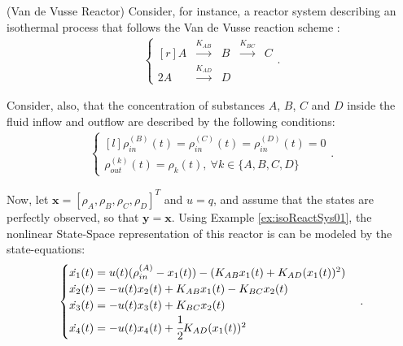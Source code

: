 \documentclass[a4paper,11pt]{book}
\numberwithin{figure}{chapter}
\numberwithin{equation}{chapter}
\numberwithin{table}{chapter}
\theoremstyle{definition}
\newtheorem{example}{Example}[chapter]
\newcounter{boxed-theorem}
\newcounter{boxed-definition}
\newcounter{boxed-example}
\newenvironment{boxed-example}[1]
{\colorlet{shadecolor}{pastelRed!20} \begin{shaded} \begin{example}{#1}}
{\end{example} \end{shaded}}
\begin{document}
\begin{boxed-example}{(Van de Vusse Reactor)} \label{ex:vanDeVusse01}
	Consider, for instance, a reactor system describing an isothermal process that follows the Van de Vusse reaction scheme \cite{VanDeVusse:1964}:
	\begin{align}
	\left\{ \begin{matrix*}[r]
	    A & \overset{K_{AB}}{\longrightarrow} & B & \overset{K_{BC}}{\longrightarrow} & C \\
	    2 A & \overset{K_{AD}}{\longrightarrow} & D & &
	\end{matrix*} \right.
	.\end{align}
	
\noindent Consider, also, that the concentration of substances $A$, $B$, $C$ and $D$ inside the fluid inflow and outflow are described by the following conditions: 
	\begin{align}
	\left\{ \begin{matrix*}[l]
		\rho_{in}^{(B)}(t) = \rho_{in}^{(C)}(t) = \rho_{in}^{(D)}(t) = 0 \\
		\rho_{out}^{(k)}(t) = \rho_k(t),\ \forall k \in \{A, B, C, D\}
	\end{matrix*} \right.
	.\end{align}
	
\noindent Now, let $\bm{x} = [\rho_A, \rho_B, \rho_C, \rho_D]^T$ and $u = q$, and assume that the states are perfectly observed, so that $\bm{y} = \bm{x}$. Using Example \ref{ex:isoReactSys01},  the nonlinear State-Space representation of this reactor is can be modeled by the state-equations:
	\begin{align}
	\begin{cases}
	    \dot{x_1}(t) = u(t) (\rho_{in}^{(A)} - x_1(t)) - (K_{AB} x_1(t) + K_{AD} (x_1(t))^2)\\
	    \dot{x_2}(t) = -u(t) x_2(t) + K_{AB} x_1(t) - K_{BC} x_2(t) \\
	    \dot{x_3}(t) = -u(t) x_3(t) + K_{BC} x_2(t) \\
	    \dot{x_4}(t) = -u(t) x_4(t) + \cfrac{1}{2} K_{AD} (x_1(t))^2
	\end{cases}
	.\end{align}
	

\end{boxed-example}
\end{document}
